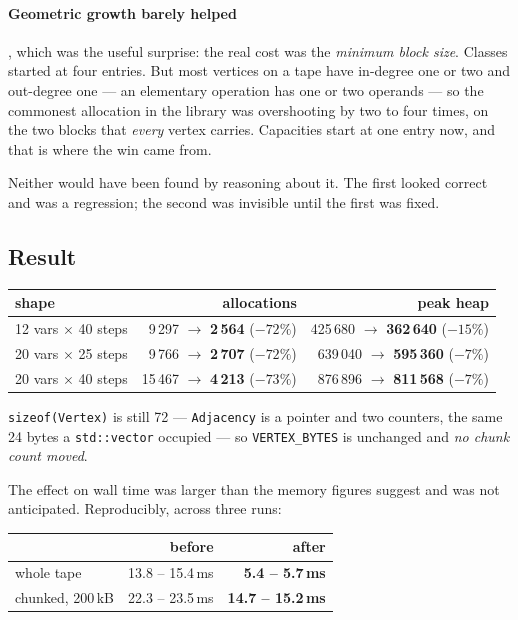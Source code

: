 \documentclass[11pt,a4paper]{report}
\newcommand{\code}[1]{\texttt{#1}}
\begin{document}
\paragraph{Geometric growth barely helped}, which was the useful surprise: the
real cost was the \emph{minimum block size}. Classes started at four entries.
But most vertices on a tape have in-degree one or two and out-degree one --- an
elementary operation has one or two operands --- so the commonest allocation in
the library was overshooting by two to four times, on the two blocks that
\emph{every} vertex carries. Capacities start at one entry now, and that is
where the win came from.

Neither would have been found by reasoning about it. The first looked correct
and was a regression; the second was invisible until the first was fixed.

\subsection*{Result}

\begin{center}
\begin{tabular}{@{}lrr@{}}
\toprule
shape & allocations & peak heap \\
\midrule
12 vars $\times$ 40 steps & 9\,297 $\to$ \textbf{2\,564} ($-72\%$) & 425\,680 $\to$ \textbf{362\,640} ($-15\%$) \\
20 vars $\times$ 25 steps & 9\,766 $\to$ \textbf{2\,707} ($-72\%$) & 639\,040 $\to$ \textbf{595\,360} ($-7\%$) \\
20 vars $\times$ 40 steps & 15\,467 $\to$ \textbf{4\,213} ($-73\%$) & 876\,896 $\to$ \textbf{811\,568} ($-7\%$) \\
\bottomrule
\end{tabular}
\end{center}

\noindent
\code{sizeof(Vertex)} is still 72 --- \code{Adjacency} is a pointer and two
counters, the same 24 bytes a \code{std::vector} occupied --- so
\code{VERTEX\_BYTES} is unchanged and \emph{no chunk count moved}.

The effect on wall time was larger than the memory figures suggest and was not
anticipated. Reproducibly, across three runs:

\begin{center}
\begin{tabular}{@{}lrr@{}}
\toprule
 & before & after \\
\midrule
whole tape          & 13.8 -- 15.4\,ms & \textbf{5.4 -- 5.7\,ms} \\
chunked, 200\,kB    & 22.3 -- 23.5\,ms & \textbf{14.7 -- 15.2\,ms} \\
\bottomrule
\end{tabular}
\end{center}
\end{document}

